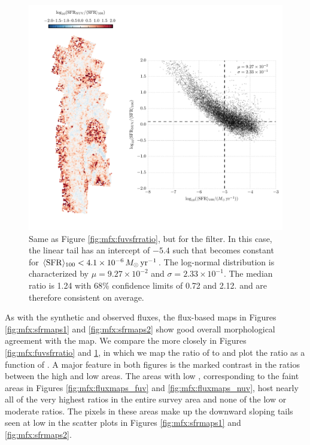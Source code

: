 \documentclass[iop, tighten]{emulateapj}
\begin{document}
\begin{figure}
\centering
\includegraphics[width=\textwidth]{m31flux-figures/sfr_nuv-vs-mean.pdf}
\caption[Ratio of the \sfr{} based on the observed extinction-corrected \nuv{}
flux to the $100\myr$ mean \sfr{}.]{Same as Figure \ref{fig:mfx:fuvsfrratio},
    but for the \nuv{} filter. In this case, the linear tail has an intercept
    of $-5.4$ such that \sfrnuv{} becomes constant for $\langle\mathrm{SFR}\rangle_{100} < 4.1\times
    10^{-6}\,M_\odot\,\mathrm{yr}^{-1}$. The log-normal distribution is characterized by $\mu
    = 9.27\times 10^{-2}$ and $\sigma = 2.33\times 10^{-1}$. The median ratio
    is 1.24 with 68\% confidence limits of 0.72 and 2.12. \sfrnuv{} and
    \sfroneh{} are therefore consistent on average.
}
\label{fig:mfx:nuvsfrratio}
\end{figure}


As with the synthetic and observed fluxes, the flux-based \sfr{} maps in
Figures \ref{fig:mfx:sfrmaps1} and \ref{fig:mfx:sfrmaps2} show good overall
morphological agreement with the \sfroneh{} map. We compare the  more
closely in Figures \ref{fig:mfx:fuvsfrratio} and \ref{fig:mfx:nuvsfrratio}, in
which we map the ratio of \sfrx{} to \sfroneh{} and plot the \sfr{} ratio as a
function of \sfroneh{}. A major feature in both figures is the marked contrast
in the \sfr{} ratios between the high and low \sfr{} areas. The areas with low
\sfroneh{}, corresponding to the faint areas in Figures
\ref{fig:mfx:fluxmaps_fuv} and \ref{fig:mfx:fluxmaps_nuv}, host nearly all of
the very highest \sfr{} ratios in the entire survey area and none of the low or
moderate ratios. The pixels in these areas make up the downward sloping tails
seen at low \sfroneh{} in the scatter plots in Figures \ref{fig:mfx:sfrmaps1}
and \ref{fig:mfx:sfrmaps2}.
\end{document}
